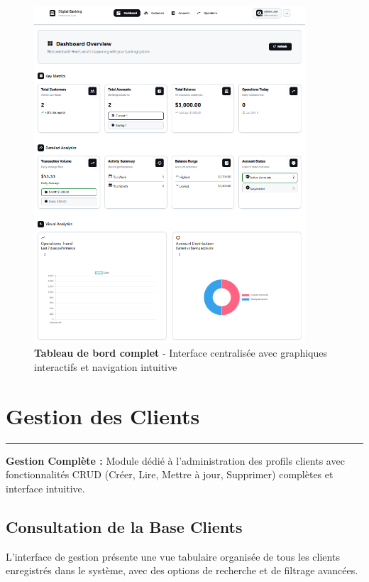 \documentclass[11pt, a4paper]{article}
\newcommand{\accentline}{\textcolor{accent}{\rule{\textwidth}{1pt}}}
\begin{document}
\begin{figure}[H]
    \centering
    \includegraphics[width=0.9\textwidth]{screenshots/02_01_dashboard_overview.png}
    \caption{\textbf{Tableau de bord complet} - Interface centralisée avec graphiques interactifs et navigation intuitive}
    \label{fig:dashboard_overview}
\end{figure}

\section{Gestion des Clients}
\accentline

\textbf{Gestion Complète :} Module dédié à l'administration des profils clients avec fonctionnalités CRUD (Créer, Lire, Mettre à jour, Supprimer) complètes et interface intuitive.

\subsection{Consultation de la Base Clients}

L'interface de gestion présente une vue tabulaire organisée de tous les clients enregistrés dans le système, avec des options de recherche et de filtrage avancées.
\end{document}
